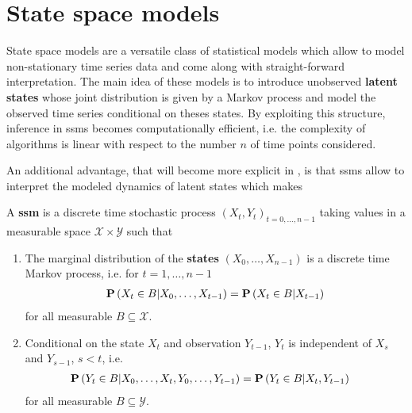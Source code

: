 \glsresetall
\chapter{State space models}
\label{cha:state_space_models}

State space models are a versatile class of statistical models which allow to model non-stationary time series data and come along with straight-forward interpretation.
The main idea of these models is to introduce unobserved \textbf{latent states} whose joint distribution is given by a Markov process and model the observed time series conditional on theses states.
By exploiting this structure, inference in \glspl{ssm} becomes computationally efficient, i.e. the complexity of algorithms is linear with respect to the number $n$ of time points considered.

An additional advantage, that will become more explicit in , is that \glspl{ssm} allow to interpret the modeled dynamics of latent states which makes


\begin{definition}
    \label{def:ssm}
    A \textbf{\gls{ssm}} is a discrete time stochastic process $(X_t, Y_t)_{t=0, \dots, n -1}$ taking values in a measurable space $\mathcal X \times \mathcal Y$ such that
    \begin{enumerate}
        \item The marginal distribution of the \textbf{states} $(X_0, \dots, X_{n - 1})$ is a discrete time Markov process, i.e. for $t = 1, \dots, n-1$
              \begin{align}
                  \label{eq:markov_property}
                  \P \left( X_{t} \in B \middle| X_0, \dots, X_{t - 1} \right) = \P \left( X_{t} \in B \middle| X_{t - 1} \right)
              \end{align}
              for all measurable $B \subseteq \mathcal X$.
        \item Conditional on the state $X_t$ and observation $Y_{t - 1}$, $Y_t$ is independent of $X_s$ and $Y_{s - 1}$, $s < t$, i.e.
              \begin{align*}
                  \P \left( Y_{t} \in B \middle| X_{0}, \dots, X_{t}, Y_{0}, \dots, Y_{t - 1} \right) & = \P \left( Y_{t} \in B | X_{t}, Y_{t - 1} \right)
              \end{align*}
              for all measurable $B \subseteq \mathcal{Y}$.
    \end{enumerate}
\end{definition}

